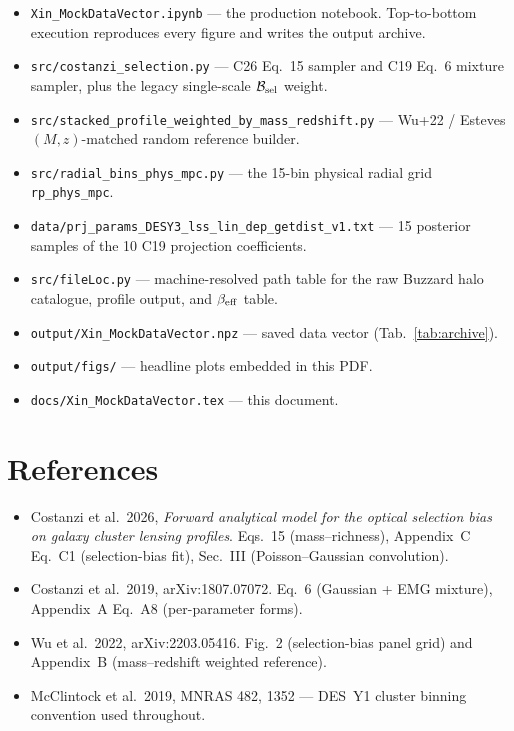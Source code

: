 \documentclass[a4paper, 11pt]{article}
\newcommand{\Bsel}{\mathcal{B}_{\rm sel}}
\newcommand{\blk}[1]{\textcolor{datablockcol}{\texttt{#1}}}
\newcommand{\pyfile}[1]{{\small\texttt{#1}}}
\begin{document}
\begin{itemize}
  \setlength\itemsep{1pt}
  \item \pyfile{Xin\_MockDataVector.ipynb} --- the production notebook.
    Top-to-bottom execution reproduces every figure and writes the
    output archive.
  \item \pyfile{src/costanzi\_selection.py} --- C26 Eq.~15 sampler and
    C19 Eq.~6 mixture sampler, plus the legacy single-scale $\Bsel$
    weight.
  \item \pyfile{src/stacked\_profile\_weighted\_by\_mass\_redshift.py} ---
    Wu+22 / Esteves $(M, z)$-matched random reference builder.
  \item \pyfile{src/radial\_bins\_phys\_mpc.py} --- the 15-bin physical
    radial grid \blk{rp\_phys\_mpc}.
  \item \pyfile{data/prj\_params\_DESY3\_lss\_lin\_dep\_getdist\_v1.txt}
    --- 15 posterior samples of the 10 C19 projection coefficients.
  \item \pyfile{src/fileLoc.py} --- machine-resolved path table for the
    raw Buzzard halo catalogue, profile output, and $\beta_{\rm eff}$
    table.
  \item \pyfile{output/Xin\_MockDataVector.npz} --- saved data vector
    (Tab.~\ref{tab:archive}).
  \item \pyfile{output/figs/} --- headline plots embedded in this PDF.
  \item \pyfile{docs/Xin\_MockDataVector.tex} --- this document.
\end{itemize}

\section{References}
\label{sec:refs}

\begin{itemize}
  \setlength\itemsep{1pt}
  \item Costanzi et al.\ 2026, \emph{Forward analytical model for the
    optical selection bias on galaxy cluster lensing profiles}.
    Eqs.~15 (mass--richness), Appendix~C Eq.~C1 (selection-bias fit),
    Sec.~III (Poisson--Gaussian convolution).
  \item Costanzi et al.\ 2019, arXiv:1807.07072. Eq.~6 (Gaussian + EMG
    mixture), Appendix~A Eq.~A8 (per-parameter forms).
  \item Wu et al.\ 2022, arXiv:2203.05416. Fig.~2 (selection-bias panel
    grid) and Appendix~B (mass--redshift weighted reference).
  \item McClintock et al.\ 2019, MNRAS 482, 1352 --- DES~Y1 cluster
    binning convention used throughout.
\end{itemize}
\end{document}
